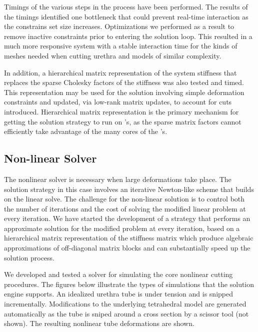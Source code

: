 Timings of the various steps in the process have been performed. The results of the timings identified one bottleneck that could prevent real-time interaction as the constrains set size increases. Optimizations we performed as a result to remove inactive constraints prior to entering the solution loop. This resulted in a much more responsive system with a stable interaction time for the kinds of meshes needed when cutting urethra and models of similar complexity.

In addition, a hierarchical matrix representation of the system stiffness that replaces the sparse Cholesky factors of the stiffness was also tested and timed. This representation may be used for the solution involving simple deformation constraints and updated, via low-rank matrix updates, to account for cuts introduced. Hierarchical matrix representation is the primary mechanism for getting the solution strategy to run on 's, as the sparse matrix factors cannot efficiently take advantage of the many cores of the 's.


\subsection{Non-linear Solver}\label{ssec:nonlinear_solver}
The nonlinear solver is necessary when large deformations take place. The solution strategy in this case involves an iterative Newton-like scheme that builds on the linear solve. The challenge for the non-linear solution is to control both the number of iterations and the cost of solving the modified linear problem at every iteration. We have started the development of a strategy that performs an approximate solution for the modified problem at every iteration, based on a hierarchical matrix representation of the stiffness matrix which produce algebraic approximations of off-diagonal matrix blocks and can substantially speed up the solution process.

We developed and tested a solver for simulating the core nonlinear cutting procedures. The figures below illustrate the types of simulations that the solution engine supports. An idealized urethra tube is under tension and is snipped incrementally. Modifications to the underlying tetrahedral model are generated automatically as the tube is sniped around a cross section by a scissor tool (not shown). The resulting nonlinear tube deformations are shown.


